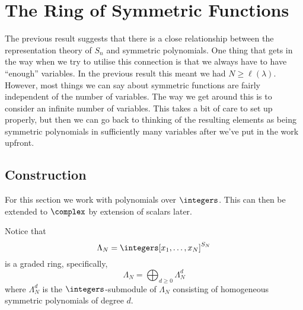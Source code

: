 \documentclass[fleqn]{NotesClass}
\begin{document}
    \section{The Ring of Symmetric Functions}
    The previous result suggests that there is a close relationship between the representation theory of \(S_n\) and symmetric polynomials.
    One thing that gets in the way when we try to utilise this connection is that we always have to have \enquote{enough} variables.
    In the previous result this meant we had \(N \ge \ell(\lambda)\).
    However, most things we can say about symmetric functions are fairly independent of the number of variables.
    The way we get around this is to consider an infinite number of variables.
    This takes a bit of care to set up properly, but then we can go back to thinking of the resulting elements as being symmetric polynomials in sufficiently many variables after we've put in the work upfront.
    
    \subsection{Construction}
    For this section we work with polynomials over \(\integers\).
    This can then be extended to \(\complex\) by extension of scalars later.
    
    Notice that
    \begin{equation}
        \Lambda_N = \integers[x_1, \dotsc, x_N]^{S_N}
    \end{equation}
    is a graded ring, specifically,
    \begin{equation}
        \Lambda_N = \bigoplus_{d \ge 0} \Lambda_N^d
    \end{equation}
    where \(\Lambda_N^d\) is the \(\integers\)-submodule of \(\Lambda_N\) consisting of homogeneous symmetric polynomials of degree \(d\).
    
\end{document}
